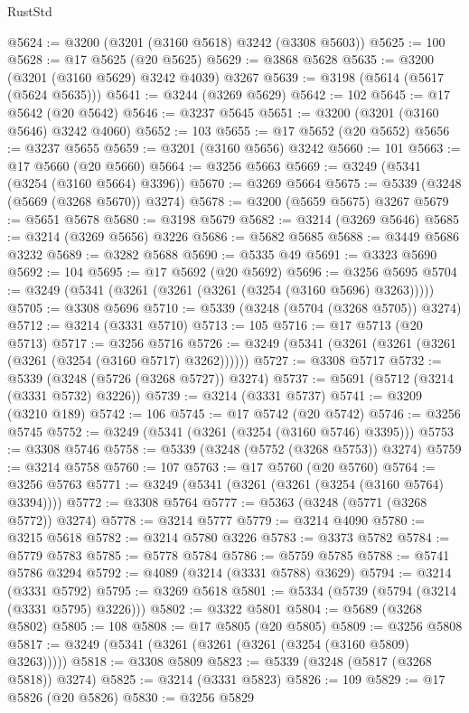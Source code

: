 \begin{lexlean}{RustStd}
\begin{coremodule}
@5624 := @3200 (@3201 (@3160 @5618) @3242 (@3308 @5603))
@5625 := 100
@5628 := @17 @5625 (@20 @5625)
@5629 := @3868 @5628
@5635 := @3200 (@3201 (@3160 @5629) @3242 @4039) @3267
@5639 := @3198 (@5614 (@5617 (@5624 @5635)))
@5641 := @3244 (@3269 @5629)
@5642 := 102
@5645 := @17 @5642 (@20 @5642)
@5646 := @3237 @5645
@5651 := @3200 (@3201 (@3160 @5646) @3242 @4060)
@5652 := 103
@5655 := @17 @5652 (@20 @5652)
@5656 := @3237 @5655
@5659 := @3201 (@3160 @5656) @3242
@5660 := 101
@5663 := @17 @5660 (@20 @5660)
@5664 := @3256 @5663
@5669 := @3249 (@5341 (@3254 (@3160 @5664) @3396))
@5670 := @3269 @5664
@5675 := @5339 (@3248 (@5669 (@3268 @5670)) @3274)
@5678 := @3200 (@5659 @5675) @3267
@5679 := @5651 @5678
@5680 := @3198 @5679
@5682 := @3214 (@3269 @5646)
@5685 := @3214 (@3269 @5656) @3226
@5686 := @5682 @5685
@5688 := @3449 @5686 @3232
@5689 := @3282 @5688
@5690 := @5335 @49
@5691 := @3323 @5690
@5692 := 104
@5695 := @17 @5692 (@20 @5692)
@5696 := @3256 @5695
@5704 := @3249 (@5341 (@3261 (@3261 (@3261 (@3254 (@3160 @5696) @3263)))))
@5705 := @3308 @5696
@5710 := @5339 (@3248 (@5704 (@3268 @5705)) @3274)
@5712 := @3214 (@3331 @5710)
@5713 := 105
@5716 := @17 @5713 (@20 @5713)
@5717 := @3256 @5716
@5726 := @3249 (@5341 (@3261 (@3261 (@3261 (@3261 (@3254 (@3160 @5717) @3262))))))
@5727 := @3308 @5717
@5732 := @5339 (@3248 (@5726 (@3268 @5727)) @3274)
@5737 := @5691 (@5712 (@3214 (@3331 @5732) @3226))
@5739 := @3214 (@3331 @5737)
@5741 := @3209 (@3210 @189)
@5742 := 106
@5745 := @17 @5742 (@20 @5742)
@5746 := @3256 @5745
@5752 := @3249 (@5341 (@3261 (@3254 (@3160 @5746) @3395)))
@5753 := @3308 @5746
@5758 := @5339 (@3248 (@5752 (@3268 @5753)) @3274)
@5759 := @3214 @5758
@5760 := 107
@5763 := @17 @5760 (@20 @5760)
@5764 := @3256 @5763
@5771 := @3249 (@5341 (@3261 (@3261 (@3254 (@3160 @5764) @3394))))
@5772 := @3308 @5764
@5777 := @5363 (@3248 (@5771 (@3268 @5772)) @3274)
@5778 := @3214 @5777
@5779 := @3214 @4090
@5780 := @3215 @5618
@5782 := @3214 @5780 @3226
@5783 := @3373 @5782
@5784 := @5779 @5783
@5785 := @5778 @5784
@5786 := @5759 @5785
@5788 := @5741 @5786 @3294
@5792 := @4089 (@3214 (@3331 @5788) @3629)
@5794 := @3214 (@3331 @5792)
@5795 := @3269 @5618
@5801 := @5334 (@5739 (@5794 (@3214 (@3331 @5795) @3226)))
@5802 := @3322 @5801
@5804 := @5689 (@3268 @5802)
@5805 := 108
@5808 := @17 @5805 (@20 @5805)
@5809 := @3256 @5808
@5817 := @3249 (@5341 (@3261 (@3261 (@3261 (@3254 (@3160 @5809) @3263)))))
@5818 := @3308 @5809
@5823 := @5339 (@3248 (@5817 (@3268 @5818)) @3274)
@5825 := @3214 (@3331 @5823)
@5826 := 109
@5829 := @17 @5826 (@20 @5826)
@5830 := @3256 @5829

\end{coremodule}
\end{lexlean}
